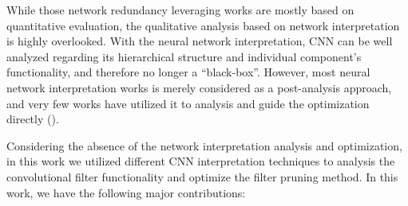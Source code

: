 \documentclass{article} %
\begin{document}
While those network redundancy leveraging works are mostly based on quantitative evaluation, the qualitative analysis based on network interpretation is highly overlooked.
	With the neural network interpretation, CNN can be well analyzed regarding its hierarchical structure and individual component's functionality, and therefore no longer a ``black-box''.
	However, most neural network interpretation works is merely considered as a post-analysis approach, and very few works have utilized it to analysis and guide the optimization directly (\cite{Yosinski:2015:ICML:AM}).

Considering the absence of the network interpretation analysis and optimization, in this work we utilized different CNN interpretation techniques to analysis the convolutional filter functionality and optimize the filter pruning method.
In this work, we have the following major contributions:
\end{document}
